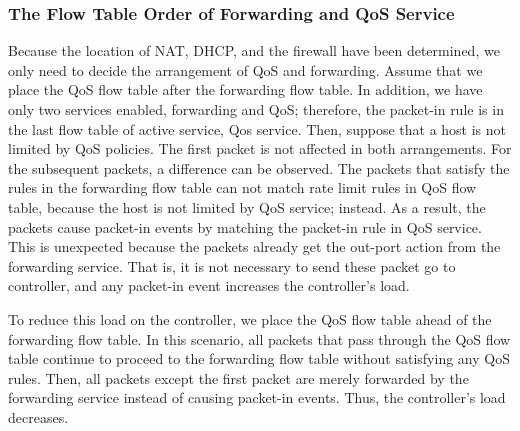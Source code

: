 \subsubsection{The Flow Table Order of Forwarding and QoS Service}
Because the location of NAT, DHCP, and the firewall have been determined, we only need to decide the arrangement of QoS and forwarding. Assume that we place the QoS flow table after the forwarding flow table. In addition, we have only two services enabled, forwarding and QoS; therefore, the packet-in rule is in the last flow table of active service, Qos service. Then, suppose that a host is not limited by QoS policies. The first packet is not affected in both arrangements. For the subsequent packets, a difference can be observed. The packets that satisfy the rules in the forwarding flow table can not match rate limit rules in QoS flow table, because the host is not limited by QoS service; instead. As a result, the packets cause packet-in events by matching the packet-in rule in QoS service. This is unexpected because the packets already get the out-port action from the forwarding service. That is, it is not necessary to send these packet go to controller, and any packet-in event increases the controller’s load.

To reduce this load on the controller, we place the QoS flow table ahead of the forwarding flow table. In this scenario, all packets that pass through the QoS flow table continue to proceed to the forwarding flow table without satisfying any QoS rules. Then, all packets except the first packet are merely forwarded by the forwarding service instead of causing packet-in events. Thus, the controller’s load decreases.
